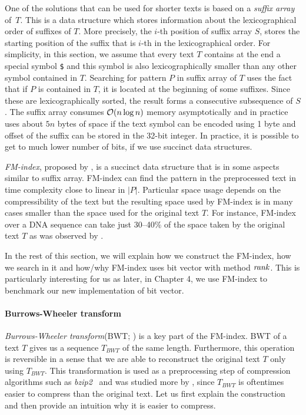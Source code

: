 One of the solutions that can be used for shorter texts is based on a \textit{suffix array} of~$T$.
This is a data structure which stores information about the lexicographical order of suffixes of $T$.
More precisely, the $i$-th position of suffix array $S$, stores the starting position of the suffix
that is $i$-th in the lexicographical order. For simplicity, in this section, we assume that every
text $T$ contains at the end a special symbol {\tt \$} and this symbol is also lexicographically
smaller than any other symbol contained in $T$. Searching for pattern $P$ in suffix array of $T$ uses
the fact that if $P$ is contained in $T$, it is located at the beginning of some suffixes. Since these
are lexicographically sorted, the result forms a consecutive subsequence of $S$. The suffix array consumes
$\mathcal{O}(n\log n)$ memory asymptotically and in practice uses about $5n$ bytes of space if the text symbol
can be encoded using 1 byte and offset of the suffix can be stored in the 32-bit integer. In practice, it
is possible to get to much lower number of bits, if we use succinct data structures.

\textit{FM-index}, proposed by \cite{ferragina2000opportunistic}, is a succinct data structure that
is in some aspects similar to suffix array. FM-index can find the pattern in the preprocessed text
in time complexity close to linear in $|P|$. Particular space usage depends on the compressibility
of the text but the resulting space used by FM-index is in many cases smaller than the space used for
the original text $T$. For instance, FM-index over a DNA sequence can take just 30--40\% of the space
taken by the original text $T$ as was observed by \cite{ferragina2001experimental}. 

In the rest of this section, we will explain how we construct the FM-index, how we search in it
and how/why FM-index uses bit vector with method $\mathit{rank}$. This is particularly interesting for us
as later, in Chapter 4, we use FM-index to benchmark our new implementation of bit vector.

\paragraph{Burrows-Wheeler transform}

\textit{Burrows-Wheeler transform}(BWT; \cite{burrows1994block}) is a key
part of the FM-index. BWT of a text $T$ gives us a sequence $\mathit{T_{BWT}}$ of the same
length. Furthermore, this operation is reversible in a sense that we are able to reconstruct
the original text $T$ only using $\mathit{T_{BWT}}$. This transformation is used as a
preprocessing step of compression algorithms such as \textit{bzip2}~\citep{seward1996bzip2}
and was studied more by \cite{manzini2001analysis}, since $T_{BWT}$ is oftentimes easier
to compress than the original text. Let us first explain the construction and then provide
an intuition why it is easier to compress.

